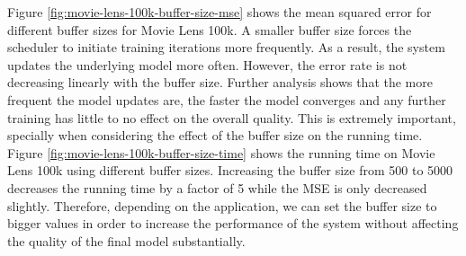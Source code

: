 \documentclass[10pt,conference,letterpaper]{IEEEtran}
\begin{document}
Figure \ref{fig:movie-lens-100k-buffer-size-mse} shows the mean squared error for different buffer sizes for Movie Lens 100k. 
A smaller buffer size forces the scheduler to initiate training iterations more frequently.
As a result, the system updates the underlying model more often.
However, the error rate is not decreasing linearly with the buffer size.
Further analysis shows that the more frequent the model updates are, the faster the model converges and any further training has little to no effect on the overall quality.
This is extremely important, specially when considering the effect of the buffer size on the running time.
Figure \ref{fig:movie-lens-100k-buffer-size-time} shows the running time on Movie Lens 100k using different buffer sizes. 
Increasing the buffer size from 500 to 5000 decreases the running time by a factor of 5 while the MSE is only decreased slightly.
Therefore, depending on the application, we can set the buffer size to bigger values in order to increase the performance of the system without affecting the quality of the final model substantially.
\end{document}
